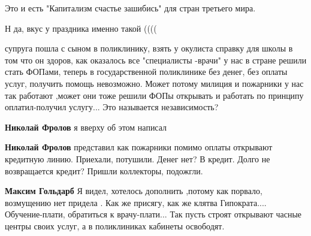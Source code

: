 \begin{itemize}
 
Это и есть "Капитализм счастье зашибись" для стран третьего мира.

 
Н да, вкус у праздника именно такой ((((


супруга пошла с сыном в поликлинику, взять у окулиста справку для школы в том
что он здоров, как оказалось все "специалисты -врачи" у нас в стране решили
стать ФОПами, теперь в государственной поликлинике без денег, без оплаты услуг,
получить помощь невозможно. Может потому милиция и пожарники у нас так работают
,может они тоже решили ФОПы открывать и работать по принципу оплатил-получил
услугу... Это называется независимость?

\begin{itemize}
 
\textbf{Николай Фролов} я вверху об этом написал

 
\textbf{Николай Фролов} представил как пожарники помимо оплаты открывают кредитную линию. Приехали, потушили. Денег нет? В кредит. Долго не возвращается кредит? Пришли коллекторы, подожгли.

 
\textbf{Максим Гольдарб} Я видел, хотелось дополнить ,потому как порвало, возмущению нет придела . Как же присягу, как же клятва Гипократа.... Обучение-плати, обратиться к врачу-плати... Так пусть строят открывают часные центры своих услуг, а в поликлиниках кабинеты освободят.


\end{itemize}
\end{itemize}
